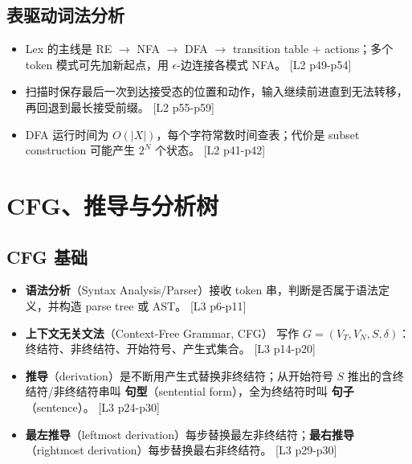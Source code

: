 \documentclass[UTF8,fontset=none,11pt]{ctexart}
\newcommand{\pg}[1]{{\scriptsize\textcolor{citegray}{[#1]}}}
\newcommand{\term}[2]{\textbf{#1}（#2）}
\begin{document}
\begin{center}
\end{center}

\subsection{表驱动词法分析}

\begin{itemize}
  \item Lex 的主线是 RE \(\to\) NFA \(\to\) DFA \(\to\) transition table + actions；多个 token 模式可先加新起点，用 \(\epsilon\)-边连接各模式 NFA。 \pg{L2 p49-p54}
  \item 扫描时保存最后一次到达接受态的位置和动作，输入继续前进直到无法转移，再回退到最长接受前缀。 \pg{L2 p55-p59}
  \item DFA 运行时间为 \(O(|X|)\)，每个字符常数时间查表；代价是 subset construction 可能产生 \(2^N\) 个状态。 \pg{L2 p41-p42}
\end{itemize}

\section{CFG、推导与分析树}

\subsection{CFG 基础}

\begin{itemize}
  \item \term{语法分析}{Syntax Analysis/Parser}接收 token 串，判断是否属于语法定义，并构造 parse tree 或 AST。 \pg{L3 p6-p11}
  \item \term{上下文无关文法}{Context-Free Grammar, CFG} 写作 \(G=(V_T,V_N,S,\delta)\)：终结符、非终结符、开始符号、产生式集合。 \pg{L3 p14-p20}
  \item \term{推导}{derivation}是不断用产生式替换非终结符；从开始符号 \(S\) 推出的含终结符/非终结符串叫 \term{句型}{sentential form}，全为终结符时叫 \term{句子}{sentence}。 \pg{L3 p24-p30}
  \item \term{最左推导}{leftmost derivation}每步替换最左非终结符；\term{最右推导}{rightmost derivation}每步替换最右非终结符。 \pg{L3 p29-p30}
\end{itemize}
\end{document}
